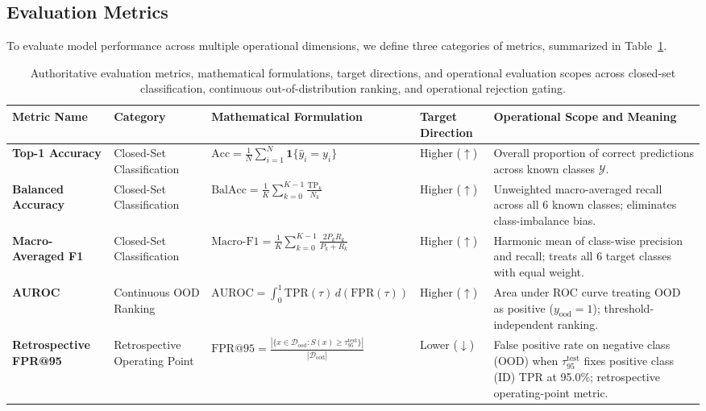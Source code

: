 \subsection{Evaluation Metrics}
\label{sec:evaluation_metrics}

To evaluate model performance across multiple operational dimensions, we define three categories of metrics, summarized in Table~\ref{tab:metric_definitions}.

\begin{table}[!t]
\caption{Authoritative evaluation metrics, mathematical formulations, target directions, and operational evaluation scopes across closed-set classification, continuous out-of-distribution ranking, and operational rejection gating.}
\label{tab:metric_definitions}
\centering
\footnotesize
\setlength{\tabcolsep}{2.5pt}
\begin{tabular}{>{\raggedright\arraybackslash}p{2.2cm} >{\centering\arraybackslash}p{2.0cm} >{\raggedright\arraybackslash}p{4.4cm} >{\centering\arraybackslash}p{1.4cm} >{\raggedright\arraybackslash}p{4.3cm}}
\toprule
\textbf{Metric Name} & \textbf{Category} & \textbf{Mathematical Formulation} & \textbf{Target Direction} & \textbf{Operational Scope and Meaning} \\
\midrule
\textbf{Top-1 Accuracy} & Closed-Set Classification & $\text{Acc} = \frac{1}{N} \sum_{i=1}^N \mathbf{1}\{\hat{y}_i = y_i\}$ & Higher ($\uparrow$) & Overall proportion of correct predictions across known classes $\mathcal{Y}$. \\
\addlinespace[3pt]
\textbf{Balanced Accuracy} & Closed-Set Classification & $\text{BalAcc} = \frac{1}{K} \sum_{k=0}^{K-1} \frac{\text{TP}_k}{N_k}$ & Higher ($\uparrow$) & Unweighted macro-averaged recall across all 6 known classes; eliminates class-imbalance bias. \\
\addlinespace[3pt]
\textbf{Macro-Averaged F1} & Closed-Set Classification & $\text{Macro-F1} = \frac{1}{K} \sum_{k=0}^{K-1} \frac{2 P_k R_k}{P_k + R_k}$ & Higher ($\uparrow$) & Harmonic mean of class-wise precision and recall; treats all 6 target classes with equal weight. \\
\midrule
\textbf{AUROC} & Continuous OOD Ranking & $\text{AUROC} = \int_{0}^1 \text{TPR}(\tau) \, d(\text{FPR}(\tau))$ & Higher ($\uparrow$) & Area under ROC curve treating OOD as positive ($y_{\text{ood}} = 1$); threshold-independent ranking. \\
\addlinespace[3pt]
\textbf{Retrospective FPR@95} & Retrospective Operating Point & $\text{FPR@95} = \frac{|\{x \in \mathcal{D}_{\text{ood}} : S(x) \ge \tau_{95}^{\text{test}}\}|}{|\mathcal{D}_{\text{ood}}|}$ & Lower ($\downarrow$) & False positive rate on negative class (OOD) when $\tau_{95}^{\text{test}}$ fixes positive class (ID) TPR at 95.0\%; retrospective operating-point metric. \\

\end{tabular}
\end{table}
